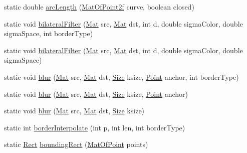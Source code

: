 \begin{DoxyCompactItemize}
\item 
static double \mbox{\hyperlink{classorg_1_1opencv_1_1imgproc_1_1_imgproc_a7e92ef5f2b2d486e256ee5e813de19c6}{arc\+Length}} (\mbox{\hyperlink{classorg_1_1opencv_1_1core_1_1_mat_of_point2f}{Mat\+Of\+Point2f}} curve, boolean closed)
\item 
static void \mbox{\hyperlink{classorg_1_1opencv_1_1imgproc_1_1_imgproc_a5cb82eca4bb445eb406ece7cfc1db780}{bilateral\+Filter}} (\mbox{\hyperlink{classorg_1_1opencv_1_1core_1_1_mat}{Mat}} src, \mbox{\hyperlink{classorg_1_1opencv_1_1core_1_1_mat}{Mat}} dst, int d, double sigma\+Color, double sigma\+Space, int border\+Type)
\item 
static void \mbox{\hyperlink{classorg_1_1opencv_1_1imgproc_1_1_imgproc_a7cba1f76aed036501535e765c84a2863}{bilateral\+Filter}} (\mbox{\hyperlink{classorg_1_1opencv_1_1core_1_1_mat}{Mat}} src, \mbox{\hyperlink{classorg_1_1opencv_1_1core_1_1_mat}{Mat}} dst, int d, double sigma\+Color, double sigma\+Space)
\item 
static void \mbox{\hyperlink{classorg_1_1opencv_1_1imgproc_1_1_imgproc_ad7911d369fbc543ce20fb9872498e9c7}{blur}} (\mbox{\hyperlink{classorg_1_1opencv_1_1core_1_1_mat}{Mat}} src, \mbox{\hyperlink{classorg_1_1opencv_1_1core_1_1_mat}{Mat}} dst, \mbox{\hyperlink{classorg_1_1opencv_1_1core_1_1_size}{Size}} ksize, \mbox{\hyperlink{classorg_1_1opencv_1_1core_1_1_point}{Point}} anchor, int border\+Type)
\item 
static void \mbox{\hyperlink{classorg_1_1opencv_1_1imgproc_1_1_imgproc_a0fe51807c2759c41bcb5e7f1d94a7653}{blur}} (\mbox{\hyperlink{classorg_1_1opencv_1_1core_1_1_mat}{Mat}} src, \mbox{\hyperlink{classorg_1_1opencv_1_1core_1_1_mat}{Mat}} dst, \mbox{\hyperlink{classorg_1_1opencv_1_1core_1_1_size}{Size}} ksize, \mbox{\hyperlink{classorg_1_1opencv_1_1core_1_1_point}{Point}} anchor)
\item 
static void \mbox{\hyperlink{classorg_1_1opencv_1_1imgproc_1_1_imgproc_ad6e54f4b433f175352dedaef88474de3}{blur}} (\mbox{\hyperlink{classorg_1_1opencv_1_1core_1_1_mat}{Mat}} src, \mbox{\hyperlink{classorg_1_1opencv_1_1core_1_1_mat}{Mat}} dst, \mbox{\hyperlink{classorg_1_1opencv_1_1core_1_1_size}{Size}} ksize)
\item 
static int \mbox{\hyperlink{classorg_1_1opencv_1_1imgproc_1_1_imgproc_a0bd258d65b0db015ac1106dea7126e9d}{border\+Interpolate}} (int p, int len, int border\+Type)
\item 
static \mbox{\hyperlink{classorg_1_1opencv_1_1core_1_1_rect}{Rect}} \mbox{\hyperlink{classorg_1_1opencv_1_1imgproc_1_1_imgproc_adf01c1b9e7cf458ac7ed330da5974503}{bounding\+Rect}} (\mbox{\hyperlink{classorg_1_1opencv_1_1core_1_1_mat_of_point}{Mat\+Of\+Point}} points)

\end{DoxyCompactItemize}
